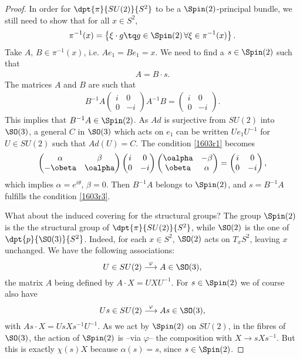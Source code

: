 \begin{proof}
	In order for $\dpt{\pi}{SU(2)}{S^2}$ to be a $\Spin(2)$-principal bundle, we still need to show that for all $x\in S^2$,
	\[
		\pi^{-1}(x)=\left\{\xi\cdot g\tq g\in\Spin(2)\,\forall\xi\in\pi^{-1}(x)\right\}.
	\]
	Take $A$, $B\in\pi^{-1}(x)$, i.e. $Ae_1=Be_1=x$. We need to find a $s\in\Spin(2)$ such that
	\begin{eqnarray}
		\label{1603r3} A=B\cdot s.
	\end{eqnarray}
	The matrices $A$ and $B$ are such that
	\begin{eqnarray}\label{1603r1}
		B^{-1} A\begin{pmatrix}
			i & 0  \\
			0 & -i
		\end{pmatrix}A^{-1} B=\begin{pmatrix}
			i & 0  \\
			0 & -i
		\end{pmatrix}.
	\end{eqnarray}
	This implies that $B^{-1} A\in\Spin(2)$. As $Ad$ is surjective from $SU(2)$ into $\SO(3)$, a general $C$ in $\SO(3)$ which acts on $e_1$ can be written $Ue_1U^{-1}$ for $U\in SU(2)$ such that $Ad(U)=C$. The condition \eqref{1603r1} becomes
	\[
		\begin{pmatrix}
			\alpha  & \beta   \\
			-\obeta & \oalpha
		\end{pmatrix}
		\begin{pmatrix}
			i & 0  \\
			0 & -i
		\end{pmatrix}
		\begin{pmatrix}
			\oalpha & -\beta \\
			\obeta  & \alpha
		\end{pmatrix}=
		\begin{pmatrix}
			i & 0  \\
			0 & -i
		\end{pmatrix},
	\]
	which implies $\alpha=e^{i\theta}$, $\beta=0$. Then $B^{-1} A$ belongs to $\Spin(2)$, and $s=B^{-1} A$ fulfills the condition \eqref{1603r3}.

	What about the induced covering for the structural groups? The group \( \Spin(2)\) is the the structural group of $\dpt{\pi}{SU(2)}{S^2}$, while \( \SO(2)\) is the one of $\dpt{p}{\SO(3)}{S^2}$. Indeed, for each $x\in S^2$, $\SO(2)$ acts on $T_xS^2$, leaving $x$ unchanged. We have the following associations:
	\[
		U\in SU(2)\stackrel{\varphi}{\longrightarrow}A\in \SO(3),
	\]
	the matrix $A$ being defined by $A\cdot X=UXU^{-1}$. For $s\in\Spin(2)$ we of course also have
	\[
		Us\in SU(2)\stackrel{\varphi}{\longrightarrow}As\in \SO(3),
	\]
	with $As\cdot X=UsXs^{-1} U^{-1}$. As we act by $\Spin(2)$ on $SU(2)$, in the fibres of $\SO(3)$, the action of $\Spin(2)$ is --via $\varphi$-- the composition with $X\to sXs^{-1}$. But this is exactly $\chi(s)X$ because $\alpha(s)=s$, since $s\in\Spin(2)$.
\end{proof}

